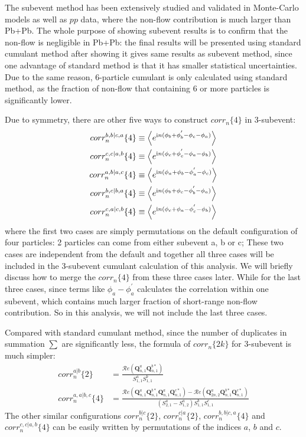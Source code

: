 The subevent method has been extensively studied and validated in Monte-Carlo models as well as $pp$ data, where the non-flow contribution is much larger than Pb+Pb. The whole purpose of showing subevent results is to confirm that the non-flow is negligible in Pb+Pb: the final results will be presented using standard cumulant method after showing it gives same results as subevent method, since one advantage of standard method is that it has smaller statistical uncertainties. Due to the same reason, 6-particle cumulant is only calculated using standard method, as the fraction of non-flow that containing 6 or more particles is significantly lower.

Due to symmetry, there are other five ways to construct $corr_n\{4\}$ in 3-subevent:
\begin{equation}
\begin{split}
corr_n^{b,b|c,a}\{4\}&\equiv \left\langle e^{\text{i}n(\phi_b+\phi_b^{'}-\phi_c-\phi_a)}\right\rangle \\
corr_n^{c,c|a,b}\{4\}&\equiv \left\langle e^{\text{i}n(\phi_c+\phi_c^{'}-\phi_a-\phi_b)}\right\rangle \\
corr_n^{a,b|a,c}\{4\}&\equiv \left\langle e^{\text{i}n(\phi_a+\phi_b-\phi_a^{'}-\phi_c)}\right\rangle \\
corr_n^{b,c|b,a}\{4\}&\equiv \left\langle e^{\text{i}n(\phi_b+\phi_c-\phi_b^{'}-\phi_a)}\right\rangle \\
corr_n^{c,a|c,b}\{4\}&\equiv \left\langle e^{\text{i}n(\phi_c+\phi_a-\phi_c^{'}-\phi_b)}\right\rangle
\end{split}
\end{equation}
where the first two cases are simply permutations on the default configuration of four particles: 2 particles can come from either subevent a, b or c; These two cases are independent from the default and together all three cases will be included in the 3-subevent cumulant calculation of this analysis. We will briefly discuss how to merge the $corr_n\{4\}$ from these three cases later. While for the last three cases, since terms like $\phi_a-\phi_a^{'}$ calculates the correlation within one subevent, which contains much larger fraction of short-range non-flow contribution. So in this analysis, we will not include the last three cases.

Compared with standard cumulant method, since the number of duplicates in summation $\sum$ are significantly less, the formula of $corr_n\{2k\}$ for 3-subevent is much simpler:
\begin{equation}
\begin{split}
corr_n^{a|b}\{2\}&=\frac{\mathcal{R}\textit{e}(\pmb{Q}_{n,1}^{a}\pmb{Q}_{n,1}^{b*})}{S_{1,1}^a S_{1,1}^b} \\
corr_n^{a,a|b,c}\{4\}&=\frac{\mathcal{R}\textit{e}(\pmb{Q}_{n,1}^a \pmb{Q}_{n,1}^{b*} \pmb{Q}_{n,1}^a \pmb{Q}_{n,1}^{c*})-\mathcal{R}\textit{e}(\pmb{Q}_{2n,2}^a \pmb{Q}_{n,1}^{b*} \pmb{Q}_{n,1}^{c*})}{(S_{2,1}^a-S_{1,2}^a)S_{1,1}^b S_{1,1}^c}
\end{split}
\end{equation}
The other similar configurations $corr_n^{b|c}\{2\}$, $corr_n^{c|a}\{2\}$, $corr_n^{b,b|c,a}\{4\}$ and $corr_n^{c,c|a,b}\{4\}$ can be easily written by permutations of the indices $a$, $b$ and $c$.



